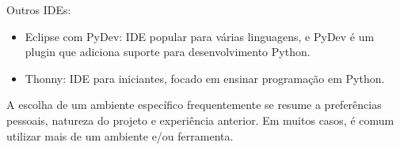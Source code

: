 \documentclass[letterpaper,10pt,english]{jupyterBook}
\begin{document}
\sphinxAtStartPar
Outros IDEs:
\begin{itemize}
\item {} 
\sphinxAtStartPar
Eclipse com PyDev: IDE popular para várias linguagens, e PyDev é um plugin que adiciona suporte para desenvolvimento Python.

\item {} 
\sphinxAtStartPar
Thonny: IDE para iniciantes, focado em ensinar programação em Python.

\end{itemize}

\sphinxAtStartPar
A escolha de um ambiente específico frequentemente se resume a preferências pessoais, natureza do projeto e experiência anterior. Em muitos casos, é comum utilizar mais de um ambiente e/ou ferramenta.

\sphinxAtStartPar
{}
\end{document}
